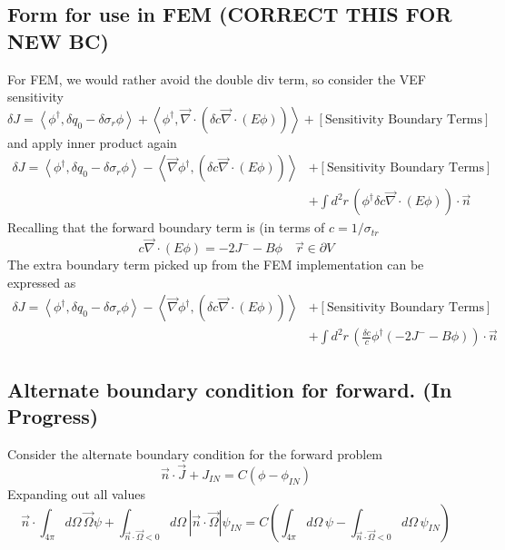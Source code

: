\documentclass{article}
\newcommand{\vr}{\vec{r}}
\newcommand{\vO}{\vec{\Omega}}
\newcommand{\bra}{\left\langle}
\newcommand{\ket}{\right\rangle}
\newcommand{\vdiv}{\vec{\nabla} \cdot}
\newcommand{\vgrad}{\vec{\nabla}}
\begin{document}
\subsection{Form for use in FEM (CORRECT THIS FOR NEW BC)}
For FEM, we would rather avoid the double div term, so consider the VEF sensitivity
\[
\delta J = \bra \phi^\dag , \delta q_0 - \delta \sigma_r \phi \ket + \bra \phi^\dag , \vdiv \left( \delta c \vdiv \left( E \phi \right) \right)  \ket + [\text{Sensitivity Boundary Terms}]
\]
and apply inner product again
\begin{align*}
\delta J = \bra \phi^\dag , \delta q_0 - \delta \sigma_r \phi \ket - \bra \vgrad \phi^\dag , \left( \delta c \vdiv \left( E \phi \right) \right)  \ket &+ [\text{Sensitivity Boundary Terms}]  \\
&+ \int d^2 r \, \left( \phi^\dag \delta c \vdiv \left( E \phi \right) \right) \cdot \vec{n}
\end{align*}
Recalling that the forward boundary term is (in terms of $c=1/ \sigma_{tr}$ 
\[
c \vec{\nabla} \cdot \left(E \phi \right)  = -2J^- - B \phi \quad \vr \in \partial V
\]
The extra boundary term picked up from the FEM implementation can be expressed as
\begin{align*}
\delta J = \bra \phi^\dag , \delta q_0 - \delta \sigma_r \phi \ket - \bra \vgrad \phi^\dag , \left( \delta c \vdiv \left( E \phi \right) \right)  \ket &+ [\text{Sensitivity Boundary Terms}]  \\
&+ \int d^2 r \, \left(\frac{\delta c}{c} \phi^\dag  \left(  -2J^- - B \phi \right) \right) \cdot \vec{n}
\end{align*}


\subsection*{Alternate boundary condition for forward. (In Progress)}
Consider the alternate boundary condition for the forward problem \cite{Wiesel}
\[
\vec{n} \cdot \vec{J} + J_{IN} = C (\phi - \phi_{IN})
\]
Expanding out all values
\[
\vec{n} \cdot \int_{4 \pi} d\Omega \, \vO \psi  
+ \int_{\vec{n}\cdot \vO <0} d\Omega \,  \left|\vec{n}\cdot \vO \right| \psi_{IN}
= C \left(  \int_{4 \pi} d\Omega \, \psi   - \int_{\vec{n}\cdot \vO <0} d\Omega \, \psi_{IN} \right)
\]

\end{document}
